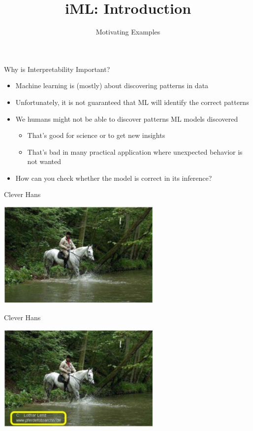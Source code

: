 \documentclass[aspectratio=169]{../latex_main/tntbeamer}  %
\title[Introduction]{iML: Introduction}
\subtitle{Motivating Examples}
\begin{document}
	
	\maketitle

\begin{frame}[c]{Why is Interpretability Important?}
	
	\begin{itemize}
	    \item Machine learning is (mostly) about discovering patterns in data
	    \item Unfortunately, it is not guaranteed that ML will identify the correct patterns
	    \pause
	    \medskip
	    \item We humans might not be able to discover patterns ML models discovered
	    \begin{itemize}
	        \item That's good for science or to get new insights
	        \item That's bad in many practical application where unexpected behavior is not wanted
	    \end{itemize}
	    \medskip
	    \pause
	    \item \alert{How can you check whether the model is correct in its inference?}
	\end{itemize}
	
\end{frame}

\begin{frame}[c]{Clever Hans }
	
	\centering
	\includegraphics[width=0.6\textwidth]{./figure/horse_without_label.PNG}
	
\end{frame}

\begin{frame}[c]{Clever Hans }
	
	\centering
	\includegraphics[width=0.6\textwidth]{./figure/horse_with_label.PNG}
	
\end{frame}
\end{document}
